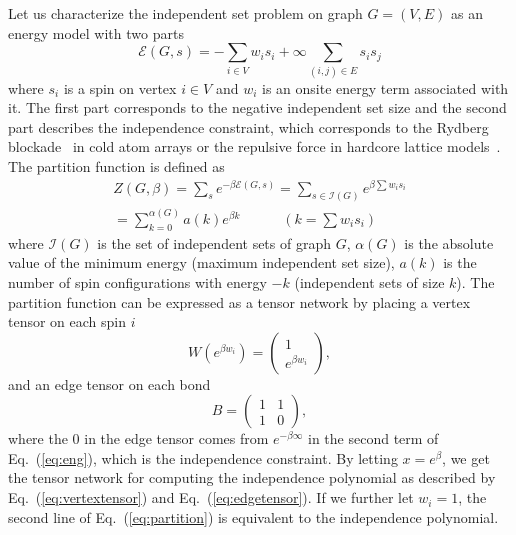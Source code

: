 \documentclass[onefignum, onetabnum]{siamart190516}
\newcommand{\<}{\langle}
\renewcommand{\>}{\rangle}
\newcommand{\Eq}[1]{Eq.~(\ref{#1})}
\begin{document}
Let us characterize the independent set problem on graph $G=(V, E)$ as an energy model with two parts
\begin{equation}\label{eq:eng}
    \mathcal{E}(G, s) = -\sum_{i\in V} w_i s_i + \infty \sum_{(i,j) \in E}s_i s_j
\end{equation}
where $s_i$ is a spin on vertex $i \in V$ and $w_i$ is an onsite energy term associated with it.
The first part corresponds to the negative independent set size and the second part describes the independence constraint, which corresponds to the Rydberg blockade~\cite{Pichler2018, Ebadi2022} in cold atom arrays or the repulsive force in hardcore lattice models~\cite{Dyre2016, Fernandes2007}.
The partition function is defined as
\begin{equation}\label{eq:partition}
    \begin{split}
    Z(G, \beta) = \sum_{s}e^{-\beta \mathcal{E}(G, s)} = \sum_{s\in \mathcal{I}(G)} e^{\beta \sum w_i s_i}\\
         = \sum_{k=0}^{\alpha(G)}a(k) e^{\beta k}  \qquad \quad (k = \sum w_i s_i)
    \end{split}
\end{equation}
where $\mathcal{I}(G)$ is the set of independent sets of graph $G$, $\alpha(G)$ is the absolute value of the minimum energy (maximum independent set size), $a(k)$ is the number of spin configurations with energy $-k$ (independent sets of size $k$).
The partition function can be expressed as a tensor network by placing a vertex tensor on each spin $i$
\begin{equation}
    W(e^{\beta w_i}) = \left(\begin{matrix}
        1 \\
        e^{\beta w_i}
    \end{matrix}\right),
\end{equation}
and an edge tensor on each bond
\begin{equation}
       B = \left(\begin{matrix}
        1  & 1\\
        1 & 0
    \end{matrix}\right),
\end{equation}
where the $0$ in the edge tensor comes from $e^{-\beta\infty}$ in the second term of \Eq{eq:eng}, which is the independence constraint.
By letting $x = e^{\beta}$, we get the tensor network for computing the independence polynomial as described by \Eq{eq:vertextensor} and \Eq{eq:edgetensor}.
If we further let $w_i=1$, the second line of \Eq{eq:partition} is equivalent to the independence polynomial.
\end{document}
